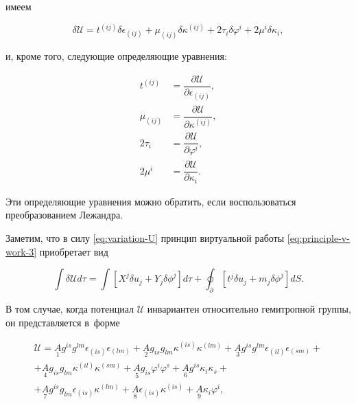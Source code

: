 имеем

\begin{equation}

\delta{\mathscr U}=t^{(ij)}\delta\epsilon_{(ij)}+\mu_{(ij)}\delta\kappa^{(ij)}+2\tau_i\delta\varphi^i+2\mu^i\delta\kappa_i,

\label{eq:variation-U}

\end{equation}

и, кроме того, следующие определяющие уравнения:

\begin{align}

t^{(ij)}&=\dfrac{\partial{\mathscr U}}{\partial\epsilon_{(ij)}},\\

\mu_{(ij)}&=\dfrac{\partial{\mathscr U}}{\partial\kappa^{(ij)}},\\

2\tau_i&=\dfrac{\partial{\mathscr U}}{\partial\varphi^i},\\

2\mu^i&=\dfrac{\partial{\mathscr U}}{\partial\kappa_i}.

\end{align}



Эти определяющие уравнения можно обратить, если воспользоваться преобразованием Лежандра.



Заметим, что в силу \eqref{eq:variation-U} принцип виртуальной работы \eqref{eq:principle-v-work-3} приобретает вид

\begin{equation}

\int\delta{\mathscr U}d\tau=\int\left[{X^j\delta u_j+Y_j\delta\phi^j}\right]d\tau+\oint _\partial\left[{t^j\delta u_j+m_j\delta\phi^j}\right]dS.

\label{eq:principle-v-work-5}

\end{equation}



В том случае, когда потенциал \({\mathscr U}\) инвариантен относительно гемитропной группы, он представляется в~форме

\begin{multline}

{\mathscr U}=\underset{1}{A}g^{is}g^{lm}\epsilon_{(is)}\epsilon_{(lm)}+\underset{2}{A}g_{is}g_{lm}\kappa^{(is)}\kappa^{(lm)}

+\underset{3}{A}g^{is}g^{lm}\epsilon_{(il)}\epsilon_{(sm)}+ \\

+\underset{4}{A}g_{is}g_{lm}\kappa^{(il)}\kappa^{(sm)}

+\underset{5}{A}g_{is}\varphi^i\varphi^s+\underset{6}{A}g^{is}\kappa_i\kappa_s+ \\

+\underset{7}{A}g^{is}g_{lm}\epsilon_{(is)}\kappa^{(lm)} 

+\underset{8}{A}\epsilon_{(is)}\kappa^{(is)}+\underset{9}{A}\kappa_i\varphi^i,

\label{eq:U-potential}

\end{multline}

